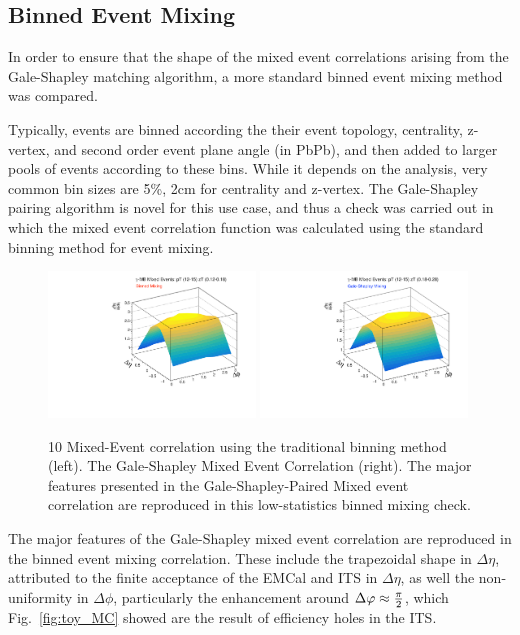 \subsection{Binned Event Mixing}
In order to ensure that the shape of the mixed event correlations arising from the Gale-Shapley matching algorithm, a more standard binned event mixing method was compared.

Typically, events are binned according the their event topology, centrality, z-vertex, and second order event plane angle (in PbPb), and then added to larger pools of events according to these bins. While it depends on the analysis, very common bin sizes are 5\%, 2cm for centrality and z-vertex. The Gale-Shapley pairing algorithm is novel for this use case, and thus a check was carried out in which the mixed event  correlation function was calculated using the standard binning method for event mixing.
\begin{figure}[htpb]
\center
\includegraphics[width=0.49\textwidth]{Data_Analysis/EventMixing/2D_Bin_Corr.pdf}%
\includegraphics[width=0.49\textwidth]{Data_Analysis/EventMixing/2D_pPb_Mix_Corr _GS.pdf}%
\caption{10 Mixed-Event correlation using the traditional binning method (left). The Gale-Shapley Mixed Event Correlation (right). The major features presented in the Gale-Shapley-Paired Mixed event correlation are reproduced in this low-statistics binned mixing check.}
\label{BIN_Mixed_2D}
\end{figure} 

The major features of the Gale-Shapley mixed event correlation are reproduced in the binned event mixing correlation. These include the trapezoidal shape in $\Delta\eta$, attributed to the finite acceptance of the EMCal and ITS in $\Delta\eta$, as well the non-uniformity in $\Delta\phi$, particularly the enhancement around $\Delta\varphi\approx\frac{\pi}{2}$, which Fig.~\ref{fig:toy_MC} showed are the result of efficiency holes in the ITS.

